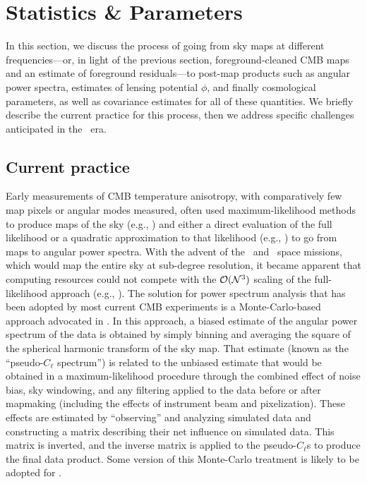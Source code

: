 \section{Statistics \& Parameters}

In this section, we discuss the process of going from sky maps at different frequencies---or, in light
of the previous section, foreground-cleaned CMB maps and an estimate of foreground residuals---to
post-map products such as angular power spectra, estimates of lensing potential $\phi$, and finally
cosmological parameters, as well as covariance estimates for all of these quantities. We briefly describe
the current practice for this process, then we address specific challenges anticipated in the \cmbexp\ era.

\subsection{Current practice}
\label{se:current}
Early measurements of CMB temperature anisotropy, with comparatively few map pixels or angular modes
measured, often used maximum-likelihood methods to produce maps of the sky (e.g., \cite{Wright:1996dk}) and
either a direct evaluation of the full likelihood or a quadratic approximation to that likelihood (e.g., \cite{Bond:1998zw}) to go from 
maps to angular power spectra. With the advent of the \wmap\ and \planck\ space 
missions, which would map the entire sky at sub-degree resolution, it became apparent that computing
resources could not compete with the $\mathcal{O}({\cal N}^3)$ scaling of the full-likelihood approach 
(e.g., \cite{Borrill:1998tn}). The solution for power spectrum analysis
that has been adopted by most current CMB experiments is a
Monte-Carlo-based approach advocated in \cite{Hivon:2001jp}. In this approach, a biased estimate of
the angular power spectrum of the data is obtained by simply binning and averaging the square 
of the spherical harmonic transform of the sky map. That estimate (known as the 
``pseudo-$C_\ell$ spectrum'') is related to the unbiased 
estimate that would be obtained in a maximum-likelihood procedure through the combined effect
of noise bias, sky windowing, and any filtering applied to the data before or after mapmaking
(including the effects of instrument beam and pixelization). These effects are estimated by ``observing''
and analyzing simulated data and constructing a matrix describing their net influence on simulated data. 
This matrix is inverted, and the inverse matrix is applied to the pseudo-$C_\ell$s to produce the 
final data product. Some version of this Monte-Carlo treatment is likely to be 
adopted for \cmbexp. 

